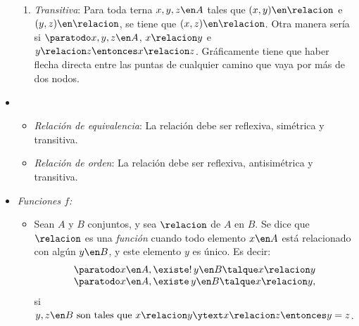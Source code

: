\begin{itemize}[label={\tiny{}}]
\begin{enumerate}[label=\tiny\faIcon{poop}]
          \item  \textit{Transitiva}: Para toda terna $x, y, z \en A$ tales que $(x, y) \en \relacion$ e $(y,z) \en \relacion$,
                se tiene que $(x, z) \en \relacion$.
                Otra manera sería si $\paratodo x, y, z \en A$, $x \relacion y$ e $y \relacion z \entonces x\relacion z$.
                Gráficamente tiene que haber flecha directa entre las puntas de cualquier camino que vaya por más de dos nodos.
        \end{enumerate}
  \item
        \begin{itemize}[label=\tiny{}]
          \item \textit{Relación de equivalencia}: La relación debe ser reflexiva, simétrica y transitiva.
          \item \textit{Relación de orden}: La relación debe ser reflexiva, antisimétrica y transitiva.
        \end{itemize}

  \item \hypertarget{teoria-1:funciones}{\textit{Funciones $f$:}}

        \begin{itemize}[label=\tiny{}]
          \item
                Sean $A$ y  $B$ conjuntos, y sea $\relacion$ de $A$ en $B$. Se dice que
                $\relacion$ es una \textit{función} cuando todo elemento $x \en A$ está relacionado con algún
                $y \en B$, y este elemento $y$ es único. Es decir:
                $$\begin{array}{l}
                    \paratodo x \en A, \existe!\, y \en B \talque x \relacion y \\
                    \paratodo x \en A, \existe\, y \en B \talque x\relacion y,
                  \end{array}
                $$
                si  $y, z \en B \text{ son tales que } x \relacion y \ytext x \relacion z \entonces y = z$.


\end{itemize}
\end{itemize}
